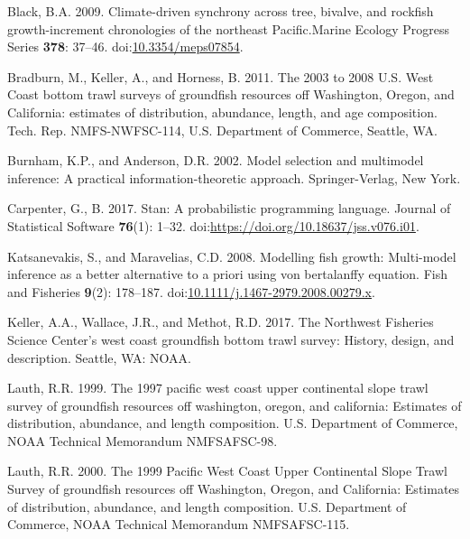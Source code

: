 \documentclass[
]{article}
\newlength{\cslhangindent}
\newlength{\cslentryspacingunit} %
\newenvironment{CSLReferences}[2] %
 {%
  \setlength{\parindent}{0pt}
  \ifodd #1
  \let\oldpar\par
  \def\par{\hangindent=\cslhangindent\oldpar}
  \fi
  \setlength{\parskip}{#2\cslentryspacingunit}
 }%
 {}
\newcommand{\meps}{Marine Ecology Progress Series\xspace}
\begin{document}
\hypertarget{refs}{}
\begin{CSLReferences}{1}{0}
\leavevmode{}%
Black, B.A. 2009. {Climate-driven synchrony across tree, bivalve, and
rockfish growth-increment chronologies of the northeast Pacific}.\meps
\textbf{378}: 37--46.
doi:\href{https://doi.org/10.3354/meps07854}{10.3354/meps07854}.

\leavevmode{}%
Bradburn, M., Keller, A., and Horness, B. 2011. {The 2003 to 2008 U.S.
West Coast bottom trawl surveys of groundfish resources off Washington,
Oregon, and California: estimates of distribution, abundance, length,
and age composition}. {Tech. Rep. NMFS-NWFSC-114, U.S. Department of
Commerce, Seattle, WA}.

\leavevmode{}%
Burnham, K.P., and Anderson, D.R. 2002. Model selection and multimodel
inference: A practical information-theoretic approach. Springer-Verlag,
New York.

\leavevmode{}%
Carpenter, G., B. 2017. Stan: A probabilistic programming language.
Journal of Statistical Software \textbf{76}(1): 1--32.
doi:\url{https://doi.org/10.18637/jss.v076.i01}.

\leavevmode{}%
Katsanevakis, S., and Maravelias, C.D. 2008. Modelling fish growth:
Multi-model inference as a better alternative to a priori using von
bertalanffy equation. Fish and Fisheries \textbf{9}(2): 178--187.
doi:\href{https://doi.org/10.1111/j.1467-2979.2008.00279.x}{10.1111/j.1467-2979.2008.00279.x}.

\leavevmode{}%
Keller, A.A., Wallace, J.R., and Methot, R.D. 2017. The {Northwest
Fisheries Science Center's} west coast groundfish bottom trawl survey:
History, design, and description. Seattle, WA: NOAA.

\leavevmode{}%
Lauth, R.R. 1999. The 1997 pacific west coast upper continental slope
trawl survey of groundfish resources off washington, oregon, and
california: Estimates of distribution, abundance, and length
composition. {U.S. Department of Commerce, NOAA Technical Memorandum
NMFSAFSC-98}.

\leavevmode{}%
Lauth, R.R. 2000. {The 1999 Pacific West Coast Upper Continental Slope
Trawl Survey of groundfish resources off Washington, Oregon, and
California: Estimates of distribution, abundance, and length
composition}. {U.S. Department of Commerce, NOAA Technical Memorandum
NMFSAFSC-115}.


\end{CSLReferences}
\end{document}
